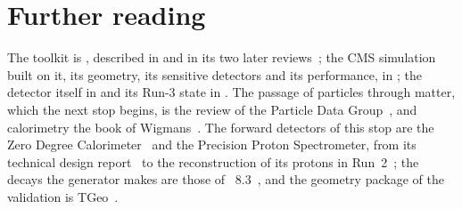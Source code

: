 \section{Further reading}
\label{sec:crossing_the_border:further_reading}
The toolkit is \GEANT, described in \cite{GEANT4:2002zbu} and in its two
later reviews~\cite{Allison:2006ve,Allison:2016lfl}; the CMS simulation built
on it, its geometry, its sensitive detectors and its performance, in
\cite{Hildreth:2017caz,Pedro:2019CMSsim}; the detector itself in
\cite{CMS:2008xjf} and its Run-3 state in \cite{CMS:2024aqx}. The passage of
particles through matter, which the next stop begins, is the review of the
Particle Data Group~\cite{ParticleDataGroup:2024cfk}, and calorimetry the
book of Wigmans~\cite{Wigmans:2000vf}. The forward detectors of this stop are
the Zero Degree Calorimeter~\cite{Grachov:2006ke} and the Precision Proton
Spectrometer, from its technical design report~\cite{CMS:2014sdw} to the
reconstruction of its protons in Run~2~\cite{CMS:2022dmc}; the decays the
generator makes are those of \PYTHIA~8.3~\cite{Bierlich:2022pfr}, and the
geometry package of the validation is TGeo~\cite{Brun:2003TGeo}.

